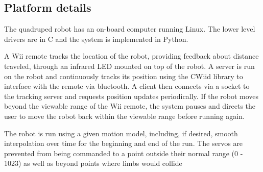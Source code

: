 \subsection{Platform details}














The quadruped robot has an on-board computer running Linux. The lower
level drivers are in C and the system is implemented in
Python. 

A Wii remote tracks the location of the robot, providing feedback
about distance traveled, through an infrared LED mounted on top of 
the robot. A server is run on the robot and continuously tracks its
position using the CWiid library\cite{cwiid} to interface with the remote
via bluetooth. A client then connects via a socket to the tracking
server and requests position updates periodically. If the robot moves 
beyond the viewable range of the Wii remote, the system pauses and
directs the user to move the robot back within the viewable range 
before running again.

The robot is run using a given motion model, including, if desired, 
smooth interpolation over time for the beginning and end of the run. 
The servos are prevented from being commanded to a point outside their
normal range (0 - 1023) as well as beyond points where limbs would collide
